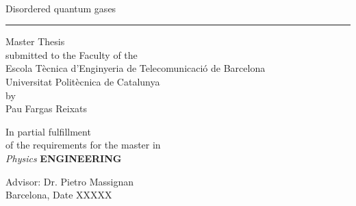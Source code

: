 \documentclass[a4paper,12pt]{article}
\begin{document}
\thispagestyle{empty}
\begin{center}
{\sffamily 
{}\\
\vspace{1cm}
{\Huge Disordered quantum gases}\\
\vspace{0.5cm}
{\color{black}\hrule height 1pt}
\vspace{1cm}
{\large{Master Thesis\\
submitted to the Faculty of the \\
Escola T\`ecnica d'Enginyeria de Telecomunicaci\'o de Barcelona \\
Universitat Polit\`ecnica de Catalunya \\
by\\
\vspace{0.4cm}
Pau Fargas Reixats}}

\nocite{*} %

\vspace{1.5cm}

{In partial fulfillment\\
of the requirements for the master in\\
\textit{Physics} \textbf{ENGINEERING}}

\vspace{2cm}

{{Advisor: Dr. Pietro Massignan}} \\
{{Barcelona, Date XXXXX}}
\thispagestyle{alim}
}

\end{center}
\newpage
\tableofcontents

\newpage
\listoffigures
\lstlistoflistings
\listoftables
\end{document}
